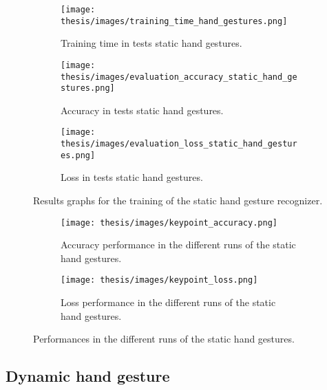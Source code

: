 \documentclass[../thesis.tex]{subfiles}
\begin{document}
\begin{figure}[H]
     \centering
     \begin{subfigure}[b]{0.45\textwidth}
         \centering
         \texttt{[image: thesis/images/training\_time\_hand\_gestures.png]}
         \caption{Training time in tests static hand gestures.}
         \label{fig:training_time_static_hand_gestures}
     \end{subfigure}
     \hfill
     \begin{subfigure}[b]{0.45\textwidth}
         \centering
         \texttt{[image: thesis/images/evaluation\_accuracy\_static\_hand\_gestures.png]}
         \caption{Accuracy in tests static hand gestures.}
         \label{fig:evaluation_accuracy_static_hand_gestures}
     \end{subfigure}
     \hfill
     \begin{subfigure}[b]{0.45\textwidth}
         \centering
         \texttt{[image: thesis/images/evaluation\_loss\_static\_hand\_gestures.png]}
         \caption{Loss in tests static hand gestures.}
         \label{fig:evaluation_loss_static_hand_gestures.}
     \end{subfigure}
        \caption{Results graphs for the training of the static hand gesture recognizer.}
        \label{fig:results_graphs_static_hand_gestures}
\end{figure}

\begin{figure}[H]
    \centering
    \begin{subfigure}[b]{\textwidth}
        \texttt{[image: thesis/images/keypoint\_accuracy.png]}
        \caption{Accuracy performance in the different runs of the static hand gestures.}
        \label{fig:accuracy_performance_static_hand_gestures}
    \end{subfigure}
    \hfill
    \begin{subfigure}[b]{\textwidth}
        \texttt{[image: thesis/images/keypoint\_loss.png]}
        \caption{Loss performance in the different runs of the static hand gestures.}
        \label{fig:loss_performance_static_hand_gestures}
    \end{subfigure}
    \caption{Performances in the different runs of the static hand gestures.}
\end{figure}

\subsection{Dynamic hand gesture}
\end{document}
